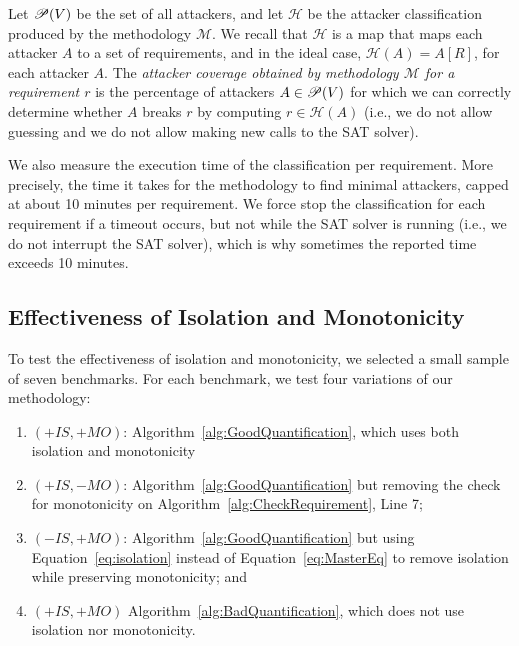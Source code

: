 {\begin{definition}[Coverage]
Let ${{\mathscr{P}}\!\left({V}\right)}$ be the set of all attackers, and let $\mathcal{H}$ be the attacker classification produced by the methodology $\mathcal{M}$. We recall that $\mathcal{H}$ is a map that maps each attacker $A$ to a set of requirements, and in the ideal case, $\mathcal{H}(A)=A[R]$, for each attacker $A$. The \emph{attacker coverage obtained by methodology $\mathcal{M}$ for a requirement $r$} is the percentage of attackers $A\in{{\mathscr{P}}\!\left({V}\right)}$ for which we can correctly determine whether $A$ breaks $r$ by computing $r\in \mathcal{H}(A)$ (i.e., we do not allow guessing and we do not allow making new calls to the SAT solver).
\end{definition}

We also measure the execution time of the classification per requirement. More precisely, the time it takes for the methodology to find minimal attackers, capped at about 10 minutes per requirement. We force stop the classification for each requirement if a timeout occurs, but not while the SAT solver is running (i.e., we do not interrupt the SAT solver), which is why sometimes the reported time exceeds 10 minutes.

\subsection{Effectiveness of Isolation and Monotonicity}
To test the effectiveness of isolation and monotonicity, we selected a small sample of seven benchmarks. For each benchmark, we test four variations of our methodology: 
\begin{enumerate}
\item{$(+IS, +MO)$}: Algorithm~\ref{alg:GoodQuantification}, which uses both isolation and monotonicity
\item{$(+IS,-MO)$}: Algorithm~\ref{alg:GoodQuantification} but removing the check for monotonicity on Algorithm~\ref{alg:CheckRequirement}, Line 7;
\item{$(-IS,+MO)$}: Algorithm~\ref{alg:GoodQuantification} but using Equation~\ref{eq:isolation} instead of Equation~\ref{eq:MasterEq} to remove isolation while preserving monotonicity; and 
\item{$(+IS,+MO)$} Algorithm~\ref{alg:BadQuantification}, which does not use isolation nor monotonicity. 
\end{enumerate}

}
